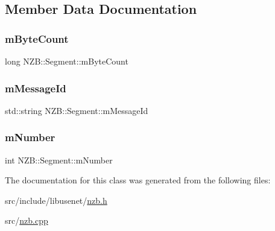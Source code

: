 \subsection{Member Data Documentation}
\hypertarget{class_n_z_b_1_1_segment_ab833915d89f52af672cf0de3a61bcb07}{}\label{class_n_z_b_1_1_segment_ab833915d89f52af672cf0de3a61bcb07} 
\subsubsection{\texorpdfstring{m\+Byte\+Count}{mByteCount}}
{\footnotesize\ttfamily long N\+Z\+B\+::\+Segment\+::m\+Byte\+Count\hspace{0.3cm}{\ttfamily [protected]}}

\hypertarget{class_n_z_b_1_1_segment_a3be7a11e0853e5eebb4153c05d663edc}{}\label{class_n_z_b_1_1_segment_a3be7a11e0853e5eebb4153c05d663edc} 
\subsubsection{\texorpdfstring{m\+Message\+Id}{mMessageId}}
{\footnotesize\ttfamily std\+::string N\+Z\+B\+::\+Segment\+::m\+Message\+Id\hspace{0.3cm}{\ttfamily [protected]}}

\hypertarget{class_n_z_b_1_1_segment_a56fbe9c8df52fae770045ab2627c6e73}{}\label{class_n_z_b_1_1_segment_a56fbe9c8df52fae770045ab2627c6e73} 
\subsubsection{\texorpdfstring{m\+Number}{mNumber}}
{\footnotesize\ttfamily int N\+Z\+B\+::\+Segment\+::m\+Number\hspace{0.3cm}{\ttfamily [protected]}}



The documentation for this class was generated from the following files\+:\begin{DoxyCompactItemize}
\item 
src/include/libusenet/\hyperlink{nzb_8h}{nzb.\+h}\item 
src/\hyperlink{nzb_8cpp}{nzb.\+cpp}\end{DoxyCompactItemize}

